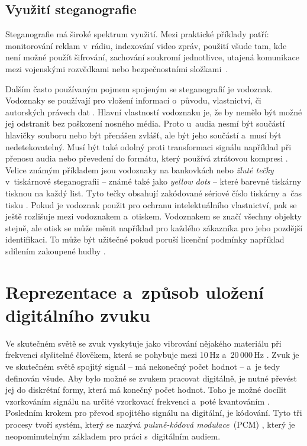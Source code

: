 \subsection*{Využití steganografie}
\label{sub:steganography-uses}

Steganografie má široké spektrum využití. Mezi praktické příklady patří:
monitorování reklam v~rádiu, indexování video zpráv, použití všude tam, kde
není možné použít šifrování, zachování soukromí jednotlivce, utajená komunikace
mezi vojenskými rozvědkami nebo bezpečnostními složkami~\cite{Dutta2020}.

Dalším často používaným pojmem spojeným se steganografií je vodoznak. Vodoznaky
se používají pro vložení informací o~původu, vlastnictví, či autorských právech
dat \cite{Djebbar2012}\cite{Dutta2020}\cite{Swanson1998}. Hlavní vlastností
vodoznaku je, že by nemělo být možné jej odstranit bez poškození nosného média.
Proto u~audia nesmí být součástí hlavičky souboru nebo být přenášen zvlášť, ale
být jeho součástí a~musí být nedetekovatelný. Musí být také odolný proti
transformaci signálu například při přenosu audia nebo převedení do formátu,
který používá ztrátovou kompresi \cite{Swanson1998}. Velice známým příkladem
jsou vodoznaky na bankovkách nebo \textit{žluté tečky} v~tiskárnové
steganografii -- známé také jako \textit{yellow dots} -- které barevné tiskárny
tisknou na každý list. Tyto tečky obsahují zakódované sériové číslo tiskárny
a~čas tisku \cite{Dutta2020}. Pokud je vodoznak použit pro ochranu
intelektuálního vlastnictví, pak se ještě rozlišuje mezi vodoznakem a~otiskem.
Vodoznakem se značí všechny objekty stejně, ale otisk se může měnit například
pro každého zákazníka pro jeho pozdější identifikaci. To může být užitečné
pokud poruší licenční podmínky například sdílením zakoupené hudby
\cite{Swanson1998}.

\section{Reprezentace a~způsob uložení digitálního zvuku}
\label{sec:digital-sound-representation}

Ve skutečném světě se zvuk vyskytuje jako vibrování nějakého materiálu při
frekvenci slyšitelné člověkem, která se pohybuje mezi 10\,Hz a~20\,000\,Hz
\cite{Swanson1998}. Zvuk je ve skutečném světě spojitý signál -- má nekonečný
počet hodnot -- a~je tedy definován všude. Aby bylo možné se zvukem pracovat
digitálně, je nutné převést jej do diskrétní formy, která má konečný počet
hodnot. Toho je možné docílit vzorkováním signálu na určité vzorkovací frekvenci a~poté
kvantováním \cite{Cernocky2021}. Posledním krokem pro převod spojitého signálu
na digitální, je kódování. Tyto tři procesy tvoří systém, který se nazývá
\textit{pulzně-kódová modulace}~(PCM) \cite{Oliver1948}, který je
neopominutelným základem pro práci s~digitálním audiem.

